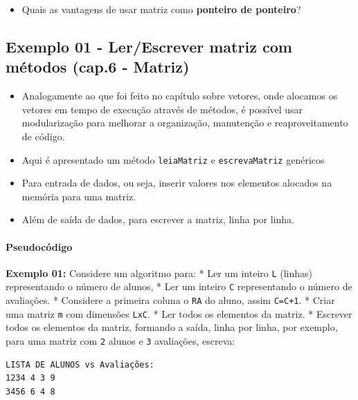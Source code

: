\documentclass[12pt,a4paper]{article}
\providecommand{\tightlist}{%
      \setlength{\itemsep}{0pt}\setlength{\parskip}{0pt}}
\begin{document}
    \begin{itemize}
\tightlist
\item
  Quais as vantagens de usar matriz como \textbf{ponteiro de ponteiro}?
\end{itemize}

    \hypertarget{exemplo-01---lerescrever-matriz-com-muxe9todos-cap.6---matriz}{%
\subsection{Exemplo 01 - Ler/Escrever matriz com métodos (cap.6 -
Matriz)}\label{exemplo-01---lerescrever-matriz-com-muxe9todos-cap.6---matriz}}

    \begin{itemize}
\item
  Analogamente ao que foi feito no capítulo sobre vetores, onde alocamos
  os vetores em tempo de execução através de métodos, é possível usar
  modularização para melhorar a organização, manutenção e
  reaproveitamento de código.
\item
  Aqui é apresentado um método \texttt{leiaMatriz} e
  \texttt{escrevaMatriz} genéricos
\item
  Para entrada de dados, ou seja, inserir valores nos elementos alocados
  na memória para uma matriz.
\item
  Além de saída de dados, para escrever a matriz, linha por linha.
\end{itemize}

    \hypertarget{pseudocuxf3digo}{%
\paragraph{Pseudocódigo}\label{pseudocuxf3digo}}

    \textbf{Exemplo 01:} Considere um algoritmo para: * Ler um inteiro
\texttt{L} (linhas) representando o número de alunos, * Ler um inteiro
\texttt{C} representando o número de avaliações. * Considere a primeira
coluna o \texttt{RA} do aluno, assim \texttt{C=C+1}. * Criar uma matriz
\texttt{m} com dimensões \texttt{LxC}. * Ler todos os elementos da
matriz. * Escrever todos os elementos da matriz, formando a saída, linha
por linha, por exemplo, para uma matriz com \texttt{2} alunos e
\texttt{3} avaliações, escreva:

\begin{verbatim}
LISTA DE ALUNOS vs Avaliações:
1234 4 3 9
3456 6 4 8
\end{verbatim}
\end{document}
